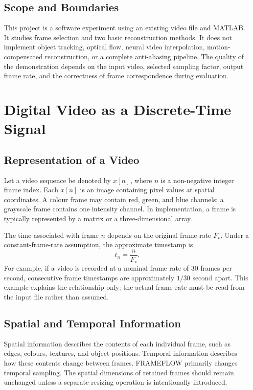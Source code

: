 \documentclass[12pt,a4paper,oneside]{report}
\begin{document}
\section{Scope and Boundaries}
This project is a software experiment using an existing video file and MATLAB. It studies frame selection and two basic reconstruction methods. It does not implement object tracking, optical flow, neural video interpolation, motion-compensated reconstruction, or a complete anti-aliasing pipeline. The quality of the demonstration depends on the input video, selected sampling factor, output frame rate, and the correctness of frame correspondence during evaluation.

\chapter{Digital Video as a Discrete-Time Signal}
\section{Representation of a Video}
Let a video sequence be denoted by $x[n]$, where $n$ is a non-negative integer frame index. Each $x[n]$ is an image containing pixel values at spatial coordinates. A colour frame may contain red, green, and blue channels; a grayscale frame contains one intensity channel. In implementation, a frame is typically represented by a matrix or a three-dimensional array.

The time associated with frame $n$ depends on the original frame rate $F_v$. Under a constant-frame-rate assumption, the approximate timestamp is
\[
t_n = \frac{n}{F_v}.
\]
For example, if a video is recorded at a nominal frame rate of 30 frames per second, consecutive frame timestamps are approximately $1/30$ second apart. This example explains the relationship only; the actual frame rate must be read from the input file rather than assumed.

\section{Spatial and Temporal Information}
Spatial information describes the contents of each individual frame, such as edges, colours, textures, and object positions. Temporal information describes how these contents change between frames. FRAMEFLOW primarily changes temporal sampling. The spatial dimensions of retained frames should remain unchanged unless a separate resizing operation is intentionally introduced.
\end{document}
